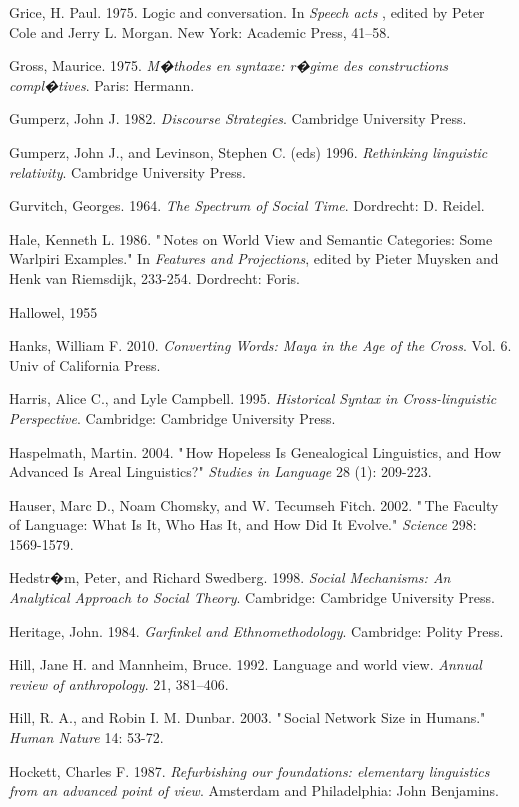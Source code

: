 Grice, H. Paul. 1975. Logic and conversation. In \textit{Speech acts}
, edited by Peter Cole and Jerry L. Morgan. New York: Academic Press, 
41--58.

Gross, Maurice. 1975. \textit{M�thodes en syntaxe: r�gime des 
constructions compl�tives}. Paris: Hermann.

Gumperz, John J. 1982. \textit{Discourse Strategies}. Cambridge 
University Press.

Gumperz, John J., and Levinson, Stephen C. (eds) 1996. \textit{
Rethinking linguistic relativity}. Cambridge University Press.

Gurvitch, Georges. 1964. \textit{The Spectrum of Social Time}. 
Dordrecht: D. Reidel.

Hale, Kenneth L. 1986. "\,Notes on World View and Semantic Categories: 
Some Warlpiri Examples." In \textit{Features and Projections}, edited 
by Pieter Muysken and Henk van Riemsdijk, 233-254. Dordrecht: Foris.

Hallowel, 1955

Hanks, William F. 2010. \textit{Converting Words: Maya in the Age of 
the Cross}. Vol. 6. Univ of California Press.

Harris, Alice C., and Lyle Campbell. 1995. \textit{Historical Syntax in 
Cross-linguistic Perspective}. Cambridge: Cambridge University Press.

Haspelmath, Martin. 2004. "\,How Hopeless Is Genealogical Linguistics, 
and How Advanced Is Areal Linguistics?" \textit{Studies in Language} 
28 (1): 209-223.

Hauser, Marc D., Noam Chomsky, and W. Tecumseh Fitch. 2002. "\,The 
Faculty of Language: What Is It, Who Has It, and How Did It Evolve." 
\textit{Science} 298: 1569-1579.

Hedstr�m, Peter, and Richard Swedberg. 1998. \textit{Social Mechanisms: 
An Analytical Approach to Social Theory}. Cambridge: Cambridge 
University Press.

Heritage, John. 1984. \textit{Garfinkel and Ethnomethodology}. 
Cambridge: Polity Press.

Hill, Jane H. and Mannheim, Bruce. 1992. Language and world view. 
\textit{Annual review of anthropology}. 21, 381--406.

Hill, R. A., and Robin I. M. Dunbar. 2003. "\,Social Network Size in 
Humans." \textit{Human Nature} 14: 53-72.

Hockett, Charles F. 1987. \textit{Refurbishing our foundations: 
elementary linguistics from an advanced point of view}. Amsterdam and 
Philadelphia: John Benjamins.

